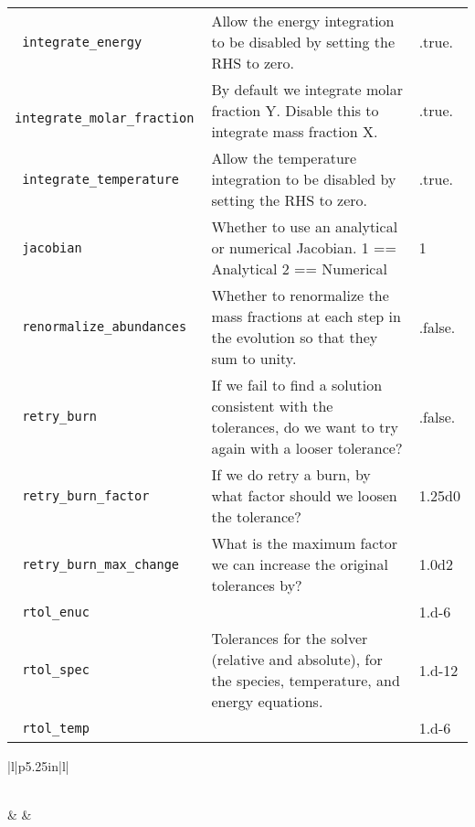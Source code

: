 \begin{landscape}
{\begin{center}
\begin{longtable}{|l|p{5.25in}|l|}
\rowcolor{tableShade}
\verb= integrate_energy = &  Allow the energy integration to be disabled by setting the RHS to zero. & .true. \\
\verb= integrate_molar_fraction = &  By default we integrate molar fraction Y. Disable this to integrate mass fraction X. & .true. \\
\rowcolor{tableShade}
\verb= integrate_temperature = &  Allow the temperature integration to be disabled by setting the RHS to zero. & .true. \\
\verb= jacobian = &  Whether to use an analytical or numerical Jacobian. 1 == Analytical 2 == Numerical & 1 \\
\rowcolor{tableShade}
\verb= renormalize_abundances = &  Whether to renormalize the mass fractions at each step in the evolution so that they sum to unity. & .false. \\
\verb= retry_burn = &  If we fail to find a solution consistent with the tolerances, do we want to try again with a looser tolerance? & .false. \\
\rowcolor{tableShade}
\verb= retry_burn_factor = &  If we do retry a burn, by what factor should we loosen the tolerance? & 1.25d0 \\
\verb= retry_burn_max_change = &  What is the maximum factor we can increase the original tolerances by? & 1.0d2 \\
\rowcolor{tableShade}
\verb= rtol_enuc = &  & 1.d-6 \\
\verb= rtol_spec = &  Tolerances for the solver (relative and absolute), for the species, temperature, and energy equations. & 1.d-12 \\
\rowcolor{tableShade}
\verb= rtol_temp = &  & 1.d-6 \\


\end{longtable}
\end{center}

} %


{\small

\renewcommand{\arraystretch}{1.5}
%
\begin{center}
\begin{longtable}{|l|p{5.25in}|l|}
\caption[kpp parameters.]{kpp parameters.} \label{table: kpp runtime} \\
%
\hline {} &
        &
        \\ \hline
\endfirsthead


\end{longtable}
\end{center}}
\end{landscape}
